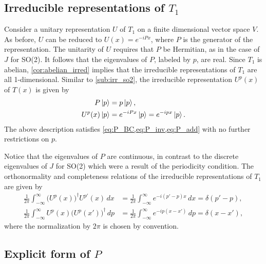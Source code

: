 \subsection{Irreducible representations of $T_1$}
Consider a unitary representation $U$ of $T_1$ on a finite dimensional vector space $V$. As before, $U$ can be reduced to $U(x) = e^{-iPx}$, where $P$ is the generator of the representation. The unitarity of $U$ requires that $P$ be Hermitian, as in the case of $J$ for SO(2). It follows that the eigenvalues of $P$, labeled by $p$, are real. Since $T_1$ is abelian, \cref{cor:abelian_irred} implies that the irreducible representations of $T_1$ are all 1-dimensional. Similar to \cref{sub:irr_so2}, the irreducible representation $U^p(x)$ of $T(x)$ is given by
\begin{align*}
    P\ket{p} &= p\ket{p}, \\
    U^p(x)\ket{p} &= e^{-iPx}\ket{p} = e^{-ip x}\ket{p}.
\end{align*}
The above description satisfies \cref{eq:P_BC,eq:P_inv,eq:P_add} with no further restrictions on $p$. 

Notice that the eigenvalues of $P$ are continuous, in contrast to the discrete eigenvalues of $J$ for SO(2) which were a result of the periodicity condition. The orthonormality and completeness relations of the irreducible representations of $T_1$ are given by
\begin{align}
    \frac{1}{2\pi}\int_{-\infty}^{\infty} {\bigl(U^p(x)\bigr)}^\dagger U^{p'}(x) \,dx &= \frac{1}{2\pi}\int_{-\infty}^{\infty} e^{-i(p'-p)x} \,dx = \delta(p'-p) \label{eq:orthogonality_P}, \\
    \frac{1}{2\pi}\int_{-\infty}^{\infty} U^{p}(x){\bigl(U^p(x')\bigr)}^\dagger \,dp &= \frac{1}{2\pi}\int_{-\infty}^{\infty} e^{-ip(x-x')} \,dp = \delta(x-x'), \label{eq:completeness_P}
\end{align}
where the normalization by $2\pi$ is chosen by convention.

\subsection{Explicit form of $P$}\label{sub:explicit_P}

